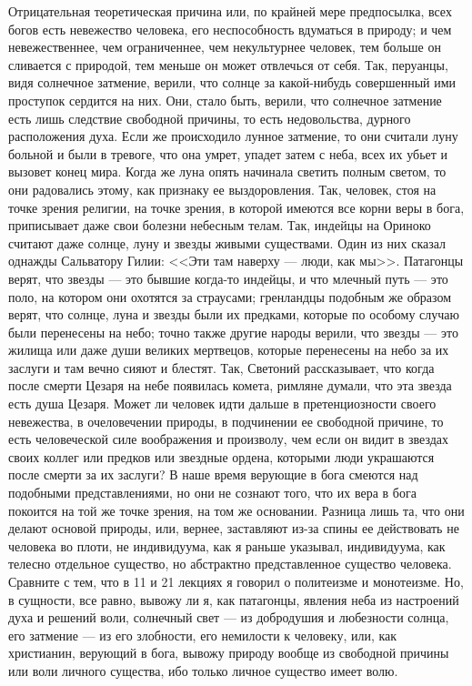 \documentclass[12pt]{article}
\begin{document}
Отрицательная теоретическая причина или, по крайней мере предпосылка, всех богов есть невежество человека, его неспособность вдуматься в природу; и чем невежественнее, чем ограниченнее, чем некультурнее человек, тем больше он сливается с природой, тем меньше он может отвлечься от себя. Так, перуанцы, видя солнечное затмение, верили, что солнце за какой-нибудь совершенный ими проступок сердится на них. Они, стало быть, верили, что солнечное затмение есть лишь следствие свободной причины, то есть недовольства, дурного расположения духа. Если же происходило лунное затмение, то они считали луну больной и были в тревоге, что она умрет, упадет затем с неба, всех их убьет и вызовет конец мира. Когда же луна опять начинала светить полным светом, то они радовались этому, как признаку ее выздоровления. Так, человек, стоя на точке зрения религии, на точке зрения, в которой имеются все корни веры в бога, приписывает даже свои болезни небесным телам. Так, индейцы на Ориноко считают даже солнце, луну и звезды живыми существами. Один из них сказал однажды Сальватору Гилии: <<Эти там наверху --- люди, как мы>>. Патагонцы верят, что звезды --- это бывшие когда-то индейцы, и что млечный путь --- это поло, на котором они охотятся за страусами; гренландцы подобным же образом верят, что солнце, луна и звезды были их предками, которые по особому случаю были перенесены на небо; точно также другие народы верили, что звезды --- это жилища или даже души великих мертвецов, которые перенесены на небо за их заслуги и там вечно сияют и блестят. Так, Светоний рассказывает, что когда после смерти Цезаря на небе появилась комета, римляне думали, что эта звезда есть душа Цезаря. Может ли человек идти дальше в претенциозности своего невежества, в очеловечении природы, в подчинении ее свободной причине, то есть человеческой силе воображения и произволу, чем если он видит в звездах своих коллег или предков или звездные ордена, которыми люди украшаются после смерти за их заслуги? В наше время верующие в бога смеются над подобными представлениями, но они не сознают того, что их вера в бога покоится на той же точке зрения, на том же основании. Разница лишь та, что они делают основой природы, или, вернее, заставляют из-за спины ее действовать не человека во плоти, не индивидуума, как я раньше указывал, индивидуума, как телесно отдельное существо, но абстрактно представленное существо человека. Сравните с тем, что в 11 и 21 лекциях я говорил о политеизме и монотеизме. Но, в сущности, все равно, вывожу ли я, как патагонцы, явления неба из настроений духа и решений воли, солнечный свет --- из добродушия и любезности солнца, его затмение --- из его злобности, его немилости к человеку, или, как христианин, верующий в бога, вывожу природу вообще из свободной причины или воли личного существа, ибо только личное существо имеет волю. 
\end{document}
